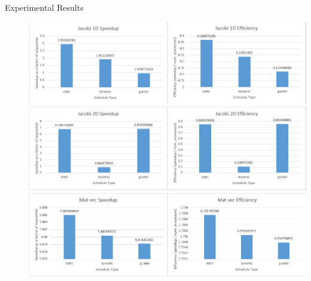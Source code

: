\documentclass{article}
\begin{document}
\begin{description}
\item[Experimental Results] 
	\includegraphics{jacobi}
	\includegraphics{jacobi2d}
	\includegraphics{mat_vec}
\end{description}
\end{document}
